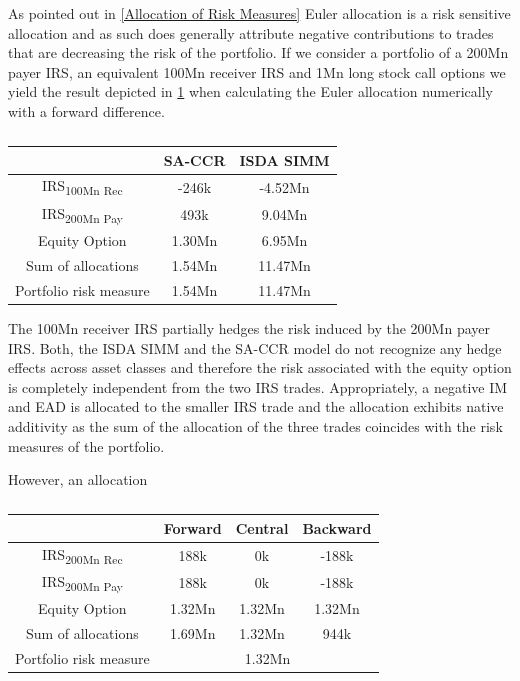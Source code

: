 \documentclass[../Thesis_AHoecherl.tex]{subfiles}
\begin{document}
    As pointed out in \ref{Allocation of Risk Measures} Euler allocation is a risk sensitive allocation and as such does generally attribute negative contributions to trades that are decreasing the risk of the portfolio. If we consider a portfolio of a 200Mn payer IRS, an equivalent 100Mn receiver IRS and 1Mn long stock call options we yield the result depicted in \ref{tab:hedge trade sample results} when calculating the Euler allocation numerically with a forward difference.
    \begin{table}[htbp]
        \label{tab:hedge trade sample results}
        \centering
        \begin{tabular}{c|c|c}
            & SA-CCR & ISDA SIMM \\
            \toprule
            IRS\textsubscript{100Mn Rec} & -246k & -4.52Mn \\
            \midrule
            IRS\textsubscript{200Mn Pay} & 493k & 9.04Mn \\
            \midrule
            Equity Option & 1.30Mn & 6.95Mn \\
            \bottomrule
            Sum of allocations & 1.54Mn & 11.47Mn \\
            \midrule
            Portfolio risk measure & 1.54Mn & 11.47Mn \\
        \end{tabular}%
        \caption{}
    \end{table}
    The 100Mn receiver IRS partially hedges the risk induced by the 200Mn payer IRS. 
    Both, the ISDA SIMM and the SA-CCR model do not recognize any hedge effects across asset classes and therefore the risk associated with the equity option is completely independent from the two IRS trades. 
    Appropriately, a negative IM and EAD is allocated to the smaller IRS trade and the allocation exhibits native additivity as the sum of the allocation of the three trades coincides with the risk measures of the portfolio.
    
    However, an allocation 
    
    \begin{table}[htbp]
        \label{tab:EAD perfect hedge}
        \centering
        \begin{tabular}{c|c|c|c}
            & Forward & Central & Backward \\
            \toprule
            IRS\textsubscript{200Mn Rec} & 188k & 0k & -188k \\
            \midrule
                IRS\textsubscript{200Mn Pay} & 188k & 0k & -188k\\
                \midrule
                Equity Option & 1.32Mn & 1.32Mn & 1.32Mn\\
                \bottomrule
                Sum of allocations & 1.69Mn & 1.32Mn & 944k \\
                \midrule
                Portfolio risk measure & \multicolumn{3}{c}{1.32Mn} \\
            \end{tabular}%
            \caption{}
    \end{table}
    
\end{document}
